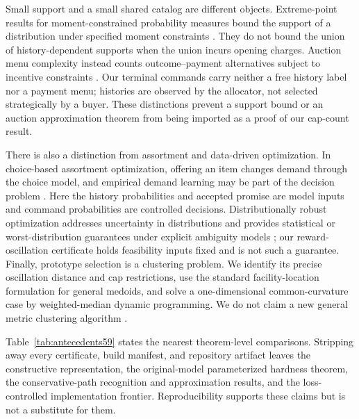Small support and a small shared catalog are different objects. Extreme-point results for moment-constrained probability measures bound the support of a distribution under specified moment constraints \citep{Winkler1988}. They do not bound the union of history-dependent supports when the union incurs opening charges. Auction menu complexity instead counts outcome--payment alternatives subject to incentive constraints \citep{HartNisan2013,Babaioff2016}. Our terminal commands carry neither a free history label nor a payment menu; histories are observed by the allocator, not selected strategically by a buyer. These distinctions prevent a support bound or an auction approximation theorem from being imported as a proof of our cap-count result.

There is also a distinction from assortment and data-driven optimization. In choice-based assortment optimization, offering an item changes demand through the choice model, and empirical demand learning may be part of the decision problem \citep{Rusmevichientong2010}. Here the history probabilities and accepted promise are model inputs and command probabilities are controlled decisions. Distributionally robust optimization addresses uncertainty in distributions and provides statistical or worst-distribution guarantees under explicit ambiguity models \citep{EsfahaniKuhn2018}; our reward-oscillation certificate holds feasibility inputs fixed and is not such a guarantee. Finally, prototype selection is a clustering problem. We identify its precise oscillation distance and cap restrictions, use the standard facility-location formulation for general medoids, and solve a one-dimensional common-curvature case by weighted-median dynamic programming. We do not claim a new general metric clustering algorithm \citep{Arya2004,Wu1991}.

Table~\ref{tab:antecedents59} states the nearest theorem-level comparisons. Stripping away every certificate, build manifest, and repository artifact leaves the constructive representation, the original-model parameterized hardness theorem, the conservative-path recognition and approximation results, and the loss-controlled implementation frontier. Reproducibility supports these claims but is not a substitute for them.
